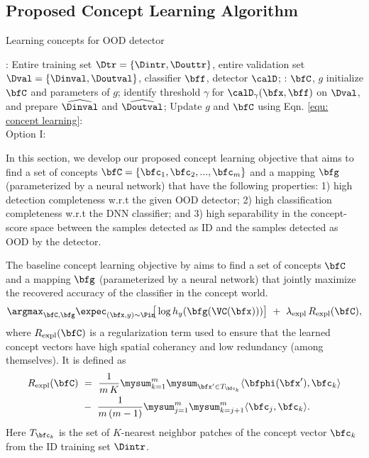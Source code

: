 \fi


\subsection{Proposed Concept Learning Algorithm}
\label{sec:concept_learning}

\label{alg:concept_learning}
\begin{algorithm}
\caption{Learning concepts for OOD detector}
\begin{algorithmic}[1]
  \INPUT: Entire training set $\Dtr = \{\Dintr, \Douttr\}$, entire validation set $\Dval = \{\Dinval, \Doutval\}$, classifier $\bff$, detector $\calD$;
  \OUTPUT: $\bfC$, $g$
  \STATE initialize $\bfC$ and parameters of $g$;
  \STATE identify threshold $\gamma$ for $\calD_\gamma(\bfx, \bff)$ on $\Dval$, and prepare $\widehat{\Dinval}$ and $\widehat{\Doutval}$;
    \STATE 
    \STATE 
	\STATE 
    \STATE Update $g$ and $\bfC$ using Eqn. \ref{equ: concept learning}: \\
	\quad Option I: 
  \ENDFOR
\end{algorithmic}
\end{algorithm}

In this section, we develop our proposed concept learning objective that aims to find a set of concepts $\bfC = \{\bfc_1, \bfc_2, ..., \bfc_m\}$ and a mapping $\bfg$ (parameterized by a neural network) that have the following properties: 1) high detection completeness w.r.t the given OOD detector; 2) high classification completeness w.r.t the DNN classifier; and 3) high separability in the concept-score space between the samples detected as ID and the samples detected as OOD by the detector. 

\cite{yeh2019completeness} 
The baseline concept learning objective by \cite{yeh2019completeness} aims to find a set of concepts $\bfC$ and a mapping $\bfg$ (parameterized by a neural network) that jointly maximize the recovered accuracy of the classifier in the concept world.
\begin{equation}
\label{equ: baseline}
    \argmax_{\bfC, \bfg} \expec_{(\bfx, y) \sim \Pin}\!\!\big[ \log h_y(\bfg(\VC(\bfx))) \big] ~+~ \lambda_{\textrm{expl}}\, R_{\textrm{expl}}(\bfC),
\end{equation}
where $R_{\textrm{expl}}(\bfC)$ is a regularization term used to ensure that the learned concept vectors have high spatial coherancy and low redundancy (among themselves). It is defined as
\begin{align}
\label{equ:regularizer_expl}
    R_{\textrm{expl}}(\bfC) ~&=~ \frac{1}{m\,K} \mysum_{k=1}^m \mysum_{\bfx^\prime \in T_{\bfc_k}} \langle \bfphi(\bfx^\prime), \bfc_k \rangle \nonumber \\
    &-~ \frac{1}{m \,(m - 1)} \mysum_{j=1}^m \mysum_{k=j + 1}^m \langle \bfc_j, \bfc_k \rangle.
\end{align}
Here $T_{\bfc_k}$ is the set of $K$-nearest neighbor patches of the concept vector $\bfc_k$ from the ID training set $\Dintr$.
 


